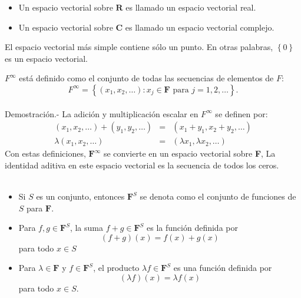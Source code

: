 \begin{mydef}\hfill
    \begin{itemize}
	\item Un espacio vectorial sobre $\textbf{R}$ es llamado un espacio vectorial real.
	\item Un espacio vectorial sobre $\textbf{C}$ es llamado un espacio vectorial complejo.
    \end{itemize}
\end{mydef}

El espacio vectorial más simple contiene sólo un punto. En otras palabras, $\left\{0\right\}$ es un espacio vectorial.

\setcounter{ejem}{21}
\begin{ejem}
    $F^{\infty}$ está definido como el conjunto de todas las secuencias de elementos de $F$:
    $$F^{\infty}=\left\{(x_1,x_2,\ldots):x_j\in \textbf{F} \mbox{ para } j=1,2,\ldots \right\}.$$\\

	Demostración.-\; La adición y multiplicación escalar en $F^{\infty}$ se definen por:
	$$
	\begin{array}{lll}
	    (x_1,x_2,\ldots)+(y_1,y_2,\ldots)&=&(x_1+y_1,x_2+y_2,\ldots)\\
	    \lambda (x_1,x_2,\ldots)&=&(\lambda x_1,\lambda x_2,\ldots)
	\end{array}
	$$
	Con estas definiciones, $\textbf{F}^{\infty}$ se convierte en un espacio vectorial sobre \textbf{F}, La identidad aditiva en este espacio vectorial es la secuencia de todos los ceros.\\\\
\end{ejem}


\setcounter{mynot}{22}
    \begin{mynot}\hfill
	\begin{itemize}
	    \item Si $S$ es un conjunto, entonces $\textbf{F}^S$ se denota como el conjunto de funciones de $S$ para $\textbf{F}$.
	    \item Para $f,g\in \textbf{F}^S$, la suma $f+g\in \textbf{F}^S$ es la función definida por $$(f+g)(x)=f(x)+g(x)$$ para todo $x\in S$
	    \item Para $\lambda \in \textbf{F}$ y $f\in \textbf{F}^S$, el producto $\lambda f \in \textbf{F}^S$ es una función definida por $$(\lambda f)(x)=\lambda f(x)$$
		para todo $x\in S$.
	\end{itemize}
    \end{mynot}

